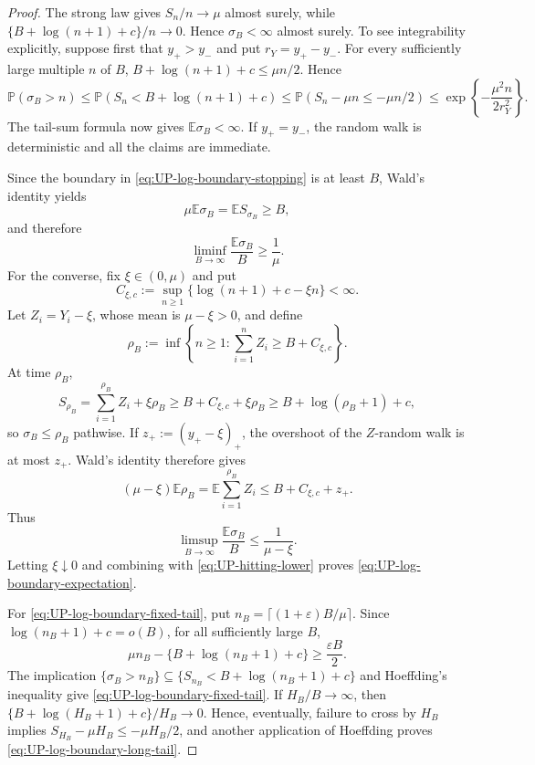 \documentclass[12pt]{article}
\theoremstyle{spaced}
\theoremstyle{remark}
\newcommand{\E}{\mathbb E}
\newcommand{\bbP}{\mathbb P}
\begin{document}
\begin{proof}
The strong law gives $S_n/n\to\mu$ almost surely, while
$\{B+\log(n+1)+c\}/n\to0$.  Hence $\sigma_B<\infty$ almost surely.
To see integrability explicitly, suppose first that $y_+>y_-$ and put
$r_Y=y_+-y_-$.  For every sufficiently large multiple $n$ of $B$,
$B+\log(n+1)+c\le \mu n/2$.  Hence
\[
 \bbP(\sigma_B>n)
 \le \bbP(S_n< B+\log(n+1)+c)
 \le \bbP(S_n-\mu n\le-\mu n/2)
 \le \exp\left\{-\frac{\mu^2n}{2r_Y^2}\right\}.
\]
The tail-sum formula now gives $\E\sigma_B<\infty$.  If $y_+=y_-$,
the random walk is deterministic and all the claims are immediate.

Since the boundary in \eqref{eq:UP-log-boundary-stopping} is at least $B$,
Wald's identity yields
\[
 \mu\E\sigma_B=\E S_{\sigma_B}\ge B,
\]
and therefore
\begin{equation}
\label{eq:UP-hitting-lower}
 \liminf_{B\to\infty}\frac{\E\sigma_B}{B}\ge\frac1\mu.
\end{equation}
For the converse, fix $\xi\in(0,\mu)$ and put
\[
 C_{\xi,c}:=
 \sup_{n\ge1}\{\log(n+1)+c-\xi n\}<\infty.
\]
Let $Z_i=Y_i-\xi$, whose mean is $\mu-\xi>0$, and define
\[
 \rho_B:=\inf\left\{n\ge1:
   \sum_{i=1}^nZ_i\ge B+C_{\xi,c}
 \right\}.
\]
At time $\rho_B$,
\[
 S_{\rho_B}
 =\sum_{i=1}^{\rho_B}Z_i+\xi\rho_B
 \ge B+C_{\xi,c}+\xi\rho_B
 \ge B+\log(\rho_B+1)+c,
\]
so $\sigma_B\le\rho_B$ pathwise.  If
$z_+:=(y_+-\xi)_+$, the overshoot of the $Z$-random walk is at most $z_+$.
Wald's identity therefore gives
\[
 (\mu-\xi)\E\rho_B
 =\E\sum_{i=1}^{\rho_B}Z_i
 \le B+C_{\xi,c}+z_+.
\]
Thus
\[
 \limsup_{B\to\infty}\frac{\E\sigma_B}{B}
 \le\frac1{\mu-\xi}.
\]
Letting $\xi\downarrow0$ and combining with
\eqref{eq:UP-hitting-lower} proves
\eqref{eq:UP-log-boundary-expectation}.

For \eqref{eq:UP-log-boundary-fixed-tail}, put
$n_B=\lceil(1+\varepsilon)B/\mu\rceil$.  Since
$\log(n_B+1)+c=o(B)$, for all sufficiently large $B$,
\[
 \mu n_B-
 \{B+\log(n_B+1)+c\}\ge \frac{\varepsilon B}{2}.
\]
The implication
$\{\sigma_B>n_B\}\subseteq
 \{S_{n_B}<B+\log(n_B+1)+c\}$ and Hoeffding's inequality give
\eqref{eq:UP-log-boundary-fixed-tail}.  If $H_B/B\to\infty$, then
$\{B+\log(H_B+1)+c\}/H_B\to0$.  Hence, eventually, failure to cross by
$H_B$ implies $S_{H_B}-\mu H_B\le-\mu H_B/2$, and another application of
Hoeffding proves \eqref{eq:UP-log-boundary-long-tail}.
\end{proof}
\end{document}

